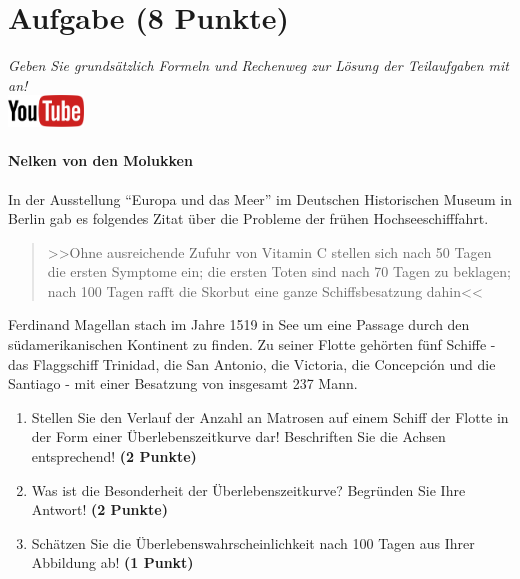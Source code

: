 \documentclass[a4paper, 9pt]{scrartcl}\usepackage[]{graphicx}\usepackage[]{xcolor}
\begin{document}
 
\clearpage

\section{Aufgabe \hfill (8 Punkte)}

\textit{Geben Sie grunds{\"a}tzlich Formeln und Rechenweg zur L{\"o}sung der
  Teilaufgaben mit an!} \\[1Ex]

\hfill\href{https://youtu.be/1B53cVFIU7Q}{\includegraphics[width =
  2cm]{img/youtube}} %
\hspace{2Ex}

\paragraph{Nelken von den Molukken}



In der Ausstellung "`Europa und das Meer"' im Deutschen Historischen Museum in
Berlin gab es folgendes Zitat {\"u}ber die Probleme der fr{\"u}hen Hochseeschifffahrt.

\begin{quote}
  >>Ohne ausreichende Zufuhr von Vitamin C stellen sich nach 50 Tagen die
  ersten Symptome ein; die ersten Toten sind nach 70 Tagen zu beklagen;
  nach 100 Tagen rafft die Skorbut eine ganze Schiffsbesatzung dahin<<
\end{quote}

Ferdinand Magellan stach im Jahre 1519 in See um eine Passage durch den
s{\"u}damerikanischen Kontinent zu finden. Zu seiner Flotte geh{\"o}rten
f{\"u}nf Schiffe - das Flaggschiff Trinidad, die San Antonio, die Victoria, die
Concepci{\'o}n und die Santiago - mit einer Besatzung von insgesamt
237 Mann. 

\begin{enumerate}
\item Stellen Sie den Verlauf der Anzahl an Matrosen auf einem Schiff der
  Flotte in der Form einer {\"U}berlebenszeitkurve dar! Beschriften Sie die
  Achsen entsprechend! \textbf{(2 Punkte)} 
\item Was ist die Besonderheit der Überlebenszeitkurve? Begründen Sie Ihre Antwort! \textbf{(2 Punkte)} 
\item Sch{\"a}tzen Sie die {\"U}berlebenswahrscheinlichkeit nach 100 Tagen
  aus Ihrer Abbildung ab! \textbf{(1 Punkt)} 
\end{enumerate}
\end{document}
